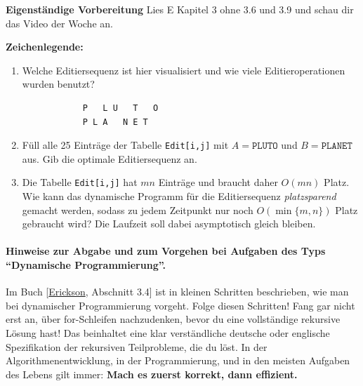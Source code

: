 \documentclass{uebung_cs}
\begin{document}
\textbf{Eigenständige Vorbereitung}
Lies  E Kapitel 3 ohne 3.6 und 3.9 und schau dir das  Video der Woche an.

\textbf{Zeichenlegende:}
\legende{}


\begin{aufgabe}[Editieren]\mbox{}
    \begin{enumerate}
        \item\bestehen Welche Editiersequenz ist hier visualisiert und wie viele Editieroperationen wurden benutzt?
        \begin{verbatim}
            P   L U   T   O
            P L A   N E T
        \end{verbatim}
        \item\bestehen Füll alle 25 Einträge der Tabelle \texttt{Edit[i,j]} mit $A=\texttt{PLUTO}$ und $B=\texttt{PLANET}$ aus. Gib die optimale Editiersequenz an.
        \item\mittel Die Tabelle \texttt{Edit[i,j]} hat $mn$ Einträge und braucht daher $O(mn)$ Platz. Wie kann das dynamische Programm für die Editiersequenz \emph{platzsparend} gemacht werden, sodass zu jedem Zeitpunkt nur noch ${O(\min\{m,n\})}$ Platz gebraucht wird? Die Laufzeit soll dabei asymptotisch gleich bleiben.
    \end{enumerate}
\end{aufgabe}

\paragraph{Hinweise zur Abgabe und zum Vorgehen bei Aufgaben des Typs \enquote{Dynamische Programmierung}.}
Im Buch [\href{https://jeffe.cs.illinois.edu/teaching/algorithms/book/Algorithms-JeffE.pdf}{Erickson}, Abschnitt 3.4] ist in kleinen Schritten beschrieben, wie man bei dynamischer Programmierung vorgeht.
Folge diesen Schritten!
Fang gar nicht erst an, über for-Schleifen nachzudenken, bevor du eine vollständige rekursive Lösung hast! Das beinhaltet eine klar verständliche deutsche oder englische Spezifikation der rekursiven Teilprobleme, die du löst.
In der Algorithmenentwicklung, in der Programmierung, und in den meisten Aufgaben des Lebens gilt immer: \textbf{Mach es zuerst korrekt, dann effizient.}
\end{document}
